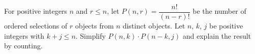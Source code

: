 For positive integers $n$ and $r\le n$, let $P(n,r)=\dfrac{n!}{(n-r)!}$ be the number of ordered selections of $r$ objects from $n$ distinct objects. Let $n$, $k$, $j$ be positive integers with $k+j\le n$. Simplify $P(n,k)\cdot P(n-k,j)$ and explain the result by counting.

